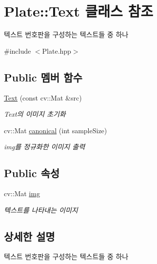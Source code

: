 \hypertarget{class_plate_1_1_text}{}\section{Plate\+:\+:Text 클래스 참조}
\label{class_plate_1_1_text}


텍스트 번호판을 구성하는 텍스트들 중 하나  




{\ttfamily \#include $<$Plate.\+hpp$>$}

\subsection*{Public 멤버 함수}
\begin{DoxyCompactItemize}
\item 
\hyperlink{class_plate_1_1_text_a7d9cc837bb93e89f5b8bd6aee6cd578b}{Text} (const cv\+::\+Mat \&src)
\begin{DoxyCompactList}\small\item\em Text의 이미지 초기화 \end{DoxyCompactList}\item 
cv\+::\+Mat \hyperlink{class_plate_1_1_text_a1fc8fd54d9274fac2740737f7b1e572e}{canonical} (int sample\+Size)
\begin{DoxyCompactList}\small\item\em img를 정규화한 이미지 출력 \end{DoxyCompactList}\end{DoxyCompactItemize}
\subsection*{Public 속성}
\begin{DoxyCompactItemize}
\item 
\mbox{\label{class_plate_1_1_text_a29f1e54dfab056697c4634d3763be2c0}} 
cv\+::\+Mat \hyperlink{class_plate_1_1_text_a29f1e54dfab056697c4634d3763be2c0}{img}
\begin{DoxyCompactList}\small\item\em 텍스트를 나타내는 이미지 \end{DoxyCompactList}\end{DoxyCompactItemize}


\subsection{상세한 설명}
텍스트 번호판을 구성하는 텍스트들 중 하나 

